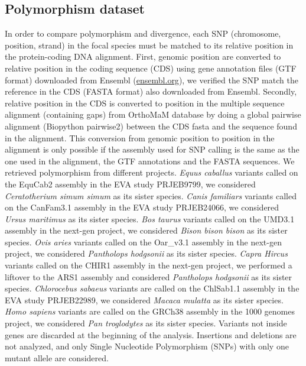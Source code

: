\documentclass{article}
\begin{document}
\subsection*{Polymorphism dataset}
In order to compare polymorphism and divergence, each SNP (chromosome, position, strand) in the focal species must be matched to its relative position in the protein-coding DNA alignment.
First, genomic position are converted to relative position in the coding sequence (CDS) using gene annotation files (GTF format) downloaded from Ensembl (\url{ensembl.org}), we verified the SNP match the reference in the CDS (FASTA format) also downloaded from Ensembl.
Secondly, relative position in the CDS is converted to position in the multiple sequence alignment (containing gaps) from OrthoMaM database\cite{ranwez_orthomam_2007, douzery_orthomam_2014, scornavacca_orthomam_2019} by doing a global pairwise alignment (Biopython pairwise2) between the CDS fasta and the sequence found in the alignment.
This conversion from genomic position to position in the alignment is only possible if the assembly used for SNP calling is the same as the one used in the alignment, the GTF annotations and the FASTA sequences.
We retrieved polymorphism from different projects.
\textit{Equus caballus} variants called on the EquCab2 assembly in the EVA study PRJEB9799, we considered \textit{Ceratotherium simum simum} as its sister species.
\textit{Canis familiars} variants called on the CanFam3.1 assembly in the EVA study PRJEB24066, we considered \textit{Ursus maritimus} as its sister species.
\textit{Bos taurus} variants called on the UMD3.1 assembly in the next-gen project, we considered \textit{Bison bison bison} as its sister species.
\textit{Ovis aries} variants called on the Oar\_v3.1 assembly in the next-gen project, we considered \textit{Pantholops hodgsonii} as its sister species.
\textit{Capra Hircus} variants called on the CHIR1 assembly in the next-gen project, we performed a liftover to the ARS1 assembly and considered \textit{Pantholops hodgsonii} as its sister species.
\textit{Chlorocebus sabaeus} variants are called on the ChlSab1.1 assembly in the EVA study PRJEB22989\cite{svardal_ancient_2017}, we considered \textit{Macaca mulatta} as its sister species.
\textit{Homo sapiens} variants are called on the GRCh38 assembly in the 1000 genomes project\cite{consortium_integrated_2012, the_1000_genomes_project_consortium_global_2015}, we considered \textit{Pan troglodytes} as its sister species.
Variants not inside genes are discarded at the beginning of the analysis.
Insertions and deletions are not analyzed, and only Single Nucleotide Polymorphism (SNPs) with only one mutant allele are considered.
\end{document}
